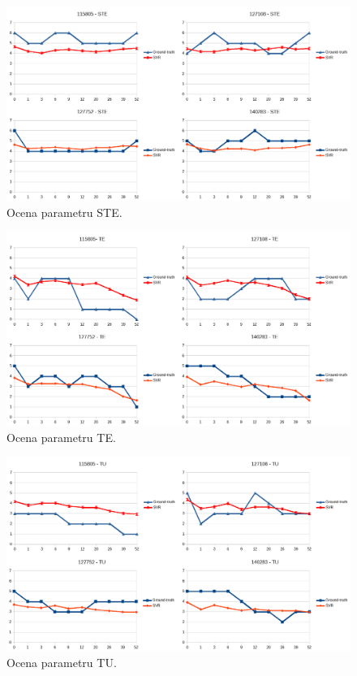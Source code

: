 \begin{figure}[h]
	\centering
	\includegraphics[width=1\textwidth]{figures/STE.png}
	\caption{Ocena parametru STE.}\label{fig:STE}
\end{figure}

\begin{figure}[h]
	\centering
	\includegraphics[width=1\textwidth]{figures/TE.png}
	\caption{Ocena parametru TE.}\label{fig:TE}
\end{figure}

\begin{figure}[h]
	\centering
	\includegraphics[width=1\textwidth]{figures/TU.png}
	\caption{Ocena parametru TU.}\label{fig:TU}
\end{figure}

